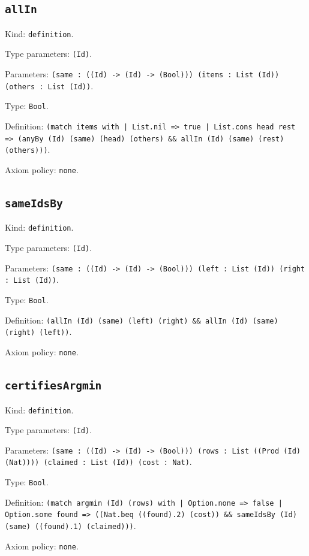 \documentclass[11pt]{article}
\begin{document}
\subsection*{\texttt{allIn}}
\noindent Kind: \texttt{definition}.\par
\noindent Type parameters: \texttt{(Id)}.\par
\noindent Parameters: \texttt{(same : ((Id) -> (Id) -> (Bool))) (items : List (Id)) (others : List (Id))}.\par
\noindent Type: \texttt{Bool}.\par
\noindent Definition: \texttt{(match items with | List.nil => true | List.cons head rest => (anyBy (Id) (same) (head) (others) \&\& allIn (Id) (same) (rest) (others)))}.\par
\noindent Axiom policy: \texttt{none}.\par
\subsection*{\texttt{sameIdsBy}}
\noindent Kind: \texttt{definition}.\par
\noindent Type parameters: \texttt{(Id)}.\par
\noindent Parameters: \texttt{(same : ((Id) -> (Id) -> (Bool))) (left : List (Id)) (right : List (Id))}.\par
\noindent Type: \texttt{Bool}.\par
\noindent Definition: \texttt{(allIn (Id) (same) (left) (right) \&\& allIn (Id) (same) (right) (left))}.\par
\noindent Axiom policy: \texttt{none}.\par
\subsection*{\texttt{certifiesArgmin}}
\noindent Kind: \texttt{definition}.\par
\noindent Type parameters: \texttt{(Id)}.\par
\noindent Parameters: \texttt{(same : ((Id) -> (Id) -> (Bool))) (rows : List ((Prod (Id) (Nat)))) (claimed : List (Id)) (cost : Nat)}.\par
\noindent Type: \texttt{Bool}.\par
\noindent Definition: \texttt{(match argmin (Id) (rows) with | Option.none => false | Option.some found => ((Nat.beq ((found).2) (cost)) \&\& sameIdsBy (Id) (same) ((found).1) (claimed)))}.\par
\noindent Axiom policy: \texttt{none}.\par
\end{document}
